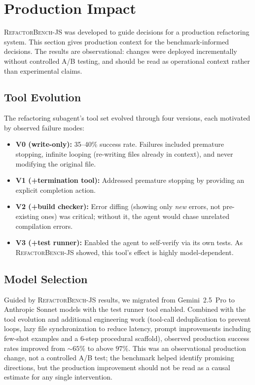 \documentclass[11pt,letterpaper]{article}
\begin{document}
\section{Production Impact}
\label{sec:production}

\textsc{RefactorBench}-JS was developed to guide decisions for a production refactoring system. This section gives production context for the benchmark-informed decisions. The results are observational: changes were deployed incrementally without controlled A/B testing, and should be read as operational context rather than experimental claims.

\subsection{Tool Evolution}

The refactoring subagent's tool set evolved through four versions, each motivated by observed failure modes:

\begin{itemize}[leftmargin=2em]
\item \textbf{V0 (write-only):} 35--40\% success rate. Failures included premature stopping, infinite looping (re-writing files already in context), and never modifying the original file.
\item \textbf{V1 (+termination tool):} Addressed premature stopping by providing an explicit completion action.
\item \textbf{V2 (+build checker):} Error diffing (showing only \emph{new} errors, not pre-existing ones) was critical; without it, the agent would chase unrelated compilation errors.
\item \textbf{V3 (+test runner):} Enabled the agent to self-verify via its own tests. As \textsc{RefactorBench}-JS showed, this tool's effect is highly model-dependent.
\end{itemize}

\subsection{Model Selection}

Guided by \textsc{RefactorBench}-JS results, we migrated from Gemini~2.5~Pro to Anthropic Sonnet models with the test runner tool enabled. Combined with the tool evolution and additional engineering work (tool-call deduplication to prevent loops, lazy file synchronization to reduce latency, prompt improvements including few-shot examples and a 6-step procedural scaffold), observed production success rates improved from ${\sim}65\%$ to above $97\%$. This was an observational production change, not a controlled A/B test; the benchmark helped identify promising directions, but the production improvement should not be read as a causal estimate for any single intervention.
\end{document}
